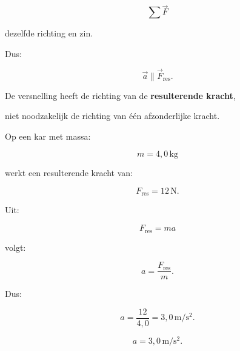 \documentclass{ximera}
\begin{document}
\[\sum\vec F\]

dezelfde richting en zin.

Dus:

\[\boxed{ \vec a\parallel\vec F_{\mathrm{res}}. }\]


\begin{opmerking}

De versnelling heeft de richting van de \textbf{resulterende kracht},

niet noodzakelijk de richting van één afzonderlijke kracht.

\end{opmerking}


\begin{voorbeeld}

Op een kar met massa:

\[m=4{,}0\,\mathrm{kg}\]

werkt een resulterende kracht van:

\[F_{\mathrm{res}}=12\,\mathrm N.\]

Uit:

\[F_{\mathrm{res}}=ma\]

volgt:

\[a = \frac{F_{\mathrm{res}}}{m}.\]

Dus:

\[a = \frac{12}{4{,}0} = 3{,}0\,\mathrm{m/s^2}.\]

\[\boxed{ a=3{,}0\,\mathrm{m/s^2}. }\]

\end{voorbeeld}
\end{document}
